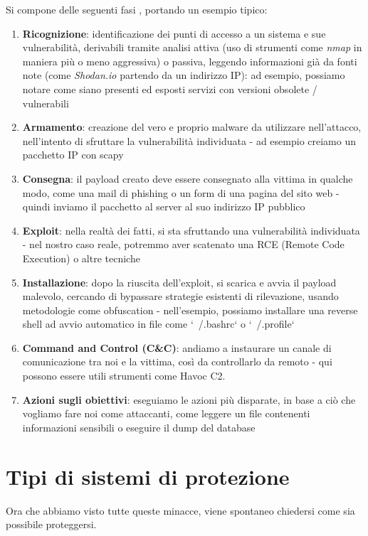 Si compone delle seguenti fasi \cite{cyber_kill_chain_360}, portando un esempio tipico:
\begin{enumerate}
    \item \textbf{Ricognizione}: identificazione dei punti di accesso a un sistema e sue vulnerabilità, derivabili tramite analisi attiva (uso di strumenti come \emph{nmap} in maniera più o meno aggressiva) o passiva, leggendo informazioni già da fonti note (come \emph{Shodan.io} partendo da un indirizzo IP): ad esempio, possiamo notare come siano presenti ed esposti servizi con versioni obsolete / vulnerabili
    
    \item \textbf{Armamento}: creazione del vero e proprio malware da utilizzare nell'attacco, nell'intento di sfruttare la vulnerabilità individuata - ad esempio creiamo un pacchetto IP con scapy

    \item \textbf{Consegna}: il payload creato deve essere consegnato alla vittima in qualche modo, come una mail di phishing o un form di una pagina del sito web - quindi inviamo il pacchetto al server al suo indirizzo IP pubblico

    \item \textbf{Exploit}: nella realtà dei fatti, si sta sfruttando una vulnerabilità individuata - nel nostro caso reale, potremmo aver scatenato una RCE (Remote Code Execution) o altre tecniche

    \item \textbf{Installazione}: dopo la riuscita dell'exploit, si scarica e avvia il payload malevolo, cercando di bypassare strategie esistenti di rilevazione, usando metodologie come obfuscation - nell'esempio, possiamo installare una reverse shell ad avvio automatico in file come `~/.bashrc` o `~/.profile`

    \item \textbf{Command and Control (C\&C)}: andiamo a instaurare un canale di comunicazione tra noi e la vittima, così da controllarlo da remoto - qui possono essere utili strumenti come Havoc C2.

    \item \textbf{Azioni sugli obiettivi}: eseguiamo le azioni più disparate, in base a ciò che vogliamo fare noi come attaccanti, come leggere un file contenenti informazioni sensibili o eseguire il dump del database
\end{enumerate}

\section{Tipi di sistemi di protezione}
Ora che abbiamo visto tutte queste minacce, viene spontaneo chiedersi come sia possibile proteggersi.

